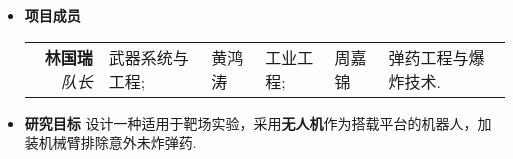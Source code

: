 %
%



\begin{itemize}
\item \textbf{项目成员}\\
\begin{tabular}{rlllll} 
\textbf{林国瑞}\emph{队长} &	武器系统与工程; &黄鸿涛 &	工业工程; &周嘉锦 &	弹药工程与爆炸技术.
\end{tabular}
\item\textbf{ 研究目标}
设计一种适用于靶场实验，采用\textbf{无人机}作为搭载平台的机器人，加装机械臂排除意外未炸弹药.
\end{itemize}
